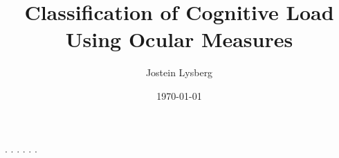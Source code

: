 \documentclass[american,titlepage]{ntnuthesis}
\title{Classification of Cognitive Load Using Ocular Measures}
\author{Jostein Lysberg}
\date{\today}
\begin{document}



\tableofcontents


\printnoidxglossaries

% 
% 

{.}
{.}
{.}
{.}
{.}
{.}
% 
% 
% 
% 

\chapter*{\bibname}
\printbibliography[heading=none]

\appendix

\end{document}
